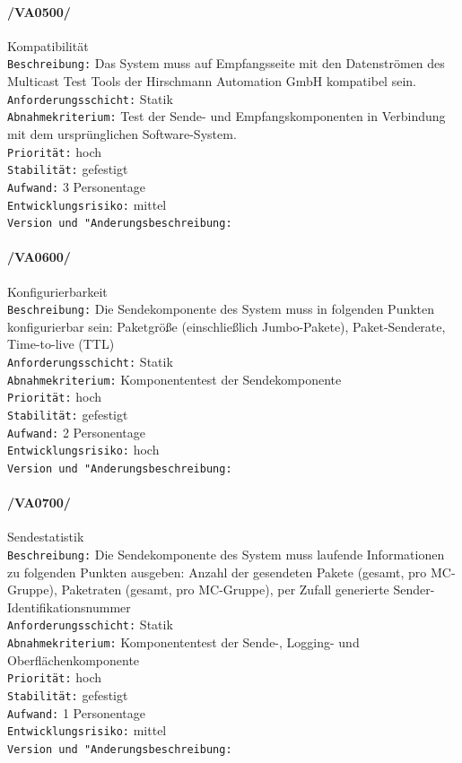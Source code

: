 \paragraph{/VA0500/} Kompatibilität\\
\texttt{Beschreibung:} Das System muss auf Empfangsseite
mit den Datenströmen des Multicast Test Tools der Hirschmann Automation GmbH
kompatibel sein.\\
\texttt{Anforderungsschicht:} Statik\\
\texttt{Abnahmekriterium:} Test der Sende- und Empfangskomponenten in Verbindung
mit dem ursprünglichen Software-System.\\
\texttt{Priorität:} hoch\\
\texttt{Stabilität:} gefestigt\\
\texttt{Aufwand:} 3 Personentage\\
\texttt{Entwicklungsrisiko:} mittel\\
\texttt{Version und "Anderungsbeschreibung:}

\paragraph{/VA0600/} Konfigurierbarkeit\\
\texttt{Beschreibung:} Die Sendekomponente des System muss in folgenden
Punkten konfigurierbar sein: Paketgröße (einschließlich Jumbo-Pakete),
Paket-Senderate, Time-to-live (TTL)\\
\texttt{Anforderungsschicht:} Statik\\
\texttt{Abnahmekriterium:} Komponententest der Sendekomponente\\
\texttt{Priorität:} hoch\\
\texttt{Stabilität:} gefestigt\\
\texttt{Aufwand:} 2 Personentage\\
\texttt{Entwicklungsrisiko:} hoch\\
\texttt{Version und "Anderungsbeschreibung:}

\paragraph{/VA0700/} Sendestatistik\\
\texttt{Beschreibung:} Die Sendekomponente des System muss laufende
Informationen zu folgenden Punkten ausgeben: Anzahl der gesendeten Pakete
(gesamt, pro MC-Gruppe), Paketraten (gesamt, pro MC-Gruppe), per Zufall
generierte Sender-Identifikationsnummer\\
\texttt{Anforderungsschicht:} Statik\\
\texttt{Abnahmekriterium:} Komponententest der Sende-, Logging- und
Oberflächenkomponente\\
\texttt{Priorität:} hoch\\
\texttt{Stabilität:} gefestigt\\
\texttt{Aufwand:} 1 Personentage\\
\texttt{Entwicklungsrisiko:} mittel\\
\texttt{Version und "Anderungsbeschreibung:}

